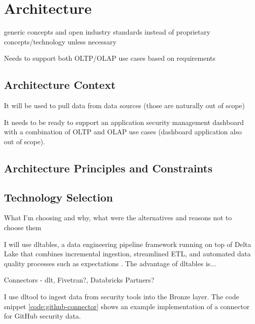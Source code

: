 \chapter{Architecture}
\label{ch:architecture}

generic concepts and open industry standards instead of proprietary concepts/technology unless necessary

Needs to support both OLTP/OLAP use cases based on requirements

\section{Architecture Context}

It will be used to pull data from data sources (those are naturally out of scope)

It needs to be ready to support an application security management dashboard with a combination of OLTP and OLAP use cases (dashboard application also out of scope).

\section{Architecture Principles and Constraints}


\section{Technology Selection}

What I'm choosing and why, what were the alternatives and reasons not to choose them

I will use \gls{dltables}, a data engineering pipeline framework running on top of Delta Lake that combines incremental ingestion, streamlined ETL, and automated data quality processes such as expectations \cite{Lee2024}. The advantage of \gls{dltables} is...



Connectors - dlt, Fivetran?, Databricks Partners?

I use \gls{dltool} to ingest data from security tools into the Bronze layer. The code snippet \ref{code:github-connector} shows an example implementation of a connector for GitHub security data.

